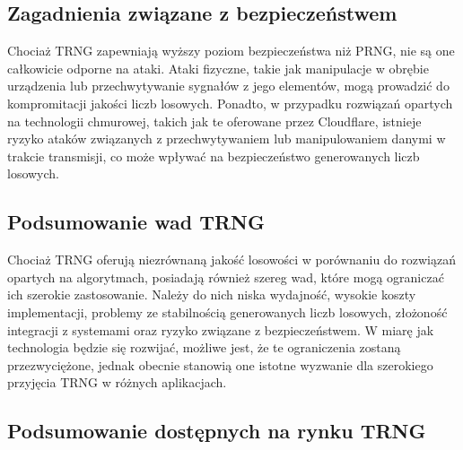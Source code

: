 \subsection{Zagadnienia związane z bezpieczeństwem}

Chociaż TRNG zapewniają wyższy poziom bezpieczeństwa niż PRNG, nie są one całkowicie odporne na ataki.
Ataki fizyczne, takie jak manipulacje w obrębie urządzenia lub przechwytywanie sygnałów z jego elementów,
mogą prowadzić do kompromitacji jakości liczb losowych.
Ponadto, w przypadku rozwiązań opartych na technologii chmurowej,
takich jak te oferowane przez Cloudflare, istnieje ryzyko ataków związanych z przechwytywaniem lub
manipulowaniem danymi w trakcie transmisji, co może wpływać na bezpieczeństwo generowanych liczb losowych.

\subsection{Podsumowanie wad TRNG}

Chociaż TRNG oferują niezrównaną jakość losowości w porównaniu do rozwiązań opartych na algorytmach,
posiadają również szereg wad, które mogą ograniczać ich szerokie zastosowanie.
Należy do nich niska wydajność, wysokie koszty implementacji, problemy ze stabilnością generowanych liczb losowych,
złożoność integracji z systemami oraz ryzyko związane z bezpieczeństwem. W miarę jak technologia będzie się rozwijać,
możliwe jest, że te ograniczenia zostaną przezwyciężone,
jednak obecnie stanowią one istotne wyzwanie dla szerokiego przyjęcia TRNG w różnych aplikacjach.

\subsection{Podsumowanie dostępnych na rynku TRNG}